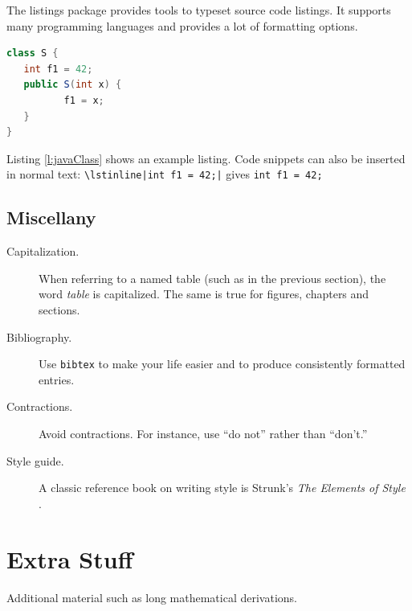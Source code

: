 \documentclass[11pt,a4paper]{book}
\begin{document}
The listings package provides tools to typeset source code
listings. It supports many programming languages and provides a lot of
formatting options.

\lstset{numbers=left, numberstyle=\tiny, stepnumber=1, numbersep=5pt}
\lstset{basicstyle=\ttfamily}
\lstset{frame=tb}

\begin{lstlisting}[float,caption=Example usage of the listing package,label=l:javaClass,language=Java]
class S {
   int f1 = 42;
   public S(int x) {
          f1 = x;
   }
}
\end{lstlisting}

Listing \ref{l:javaClass} shows an example listing. Code snippets can
also be inserted in normal text:
\verb$\lstinline|int f1 = 42;|$ gives \lstinline$int f1 = 42;$

\section{Miscellany}

\begin{description}

\item[Capitalization.] When referring to a named table (such as in the
  previous section), the word \emph{table} is capitalized. The same is
  true for figures, chapters and sections.

\item[Bibliography.] Use \verb|bibtex| to make your life easier and to
  produce consistently formatted entries.

\item[Contractions.] Avoid contractions. For instance, use ``do not''
  rather than ``don't.''

\item[Style guide.] A classic reference book on writing style is
  Strunk's \emph{The Elements of Style} \cite{Strunk-ElementsOfStyle}.

\end{description}

\appendix
\chapter{Extra Stuff}
\label{s:ExtraStuff}

Additional material such as long mathematical derivations.




\end{document}
